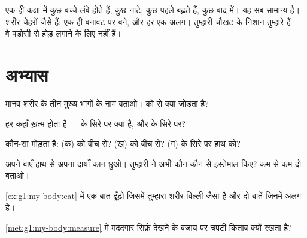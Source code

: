 \begin{remark}[हर शरीर अलग है]\label{rem:g1:my-body:different}
एक ही कक्षा में कुछ बच्चे लंबे होते हैं, कुछ नाटे; कुछ पहले बढ़ते हैं,
कुछ बाद में। यह सब सामान्य है। शरीर चेहरों जैसे हैं: एक ही बनावट पर
बने, और हर एक अलग। तुम्हारी चौखट के निशान तुम्हारे हैं --- वे पड़ोसी
से होड़ लगाने के लिए नहीं हैं।
\end{remark}

\section{अभ्यास}

\begin{exercise}[$\star$]\label{exo:g1:my-body:1}
मानव शरीर के तीन मुख्य भागों के नाम बताओ।  को  से क्या जोड़ता
है?
\end{exercise}

\begin{exercise}[$\star$]\label{exo:g1:my-body:2}
हर  कहाँ ख़त्म होता है ---  के सिरे पर क्या है, और  के
सिरे पर?
\end{exercise}

\begin{exercise}[$\star$]\label{exo:g1:my-body:3}
कौन-सा  मोड़ता है: (क)  को बीच से? (ख)  को बीच से? (ग)
 के सिरे पर हाथ को?
\end{exercise}

\begin{exercise}[$\star$]\label{exo:g1:my-body:4}
अपने बाएँ हाथ से अपना दायाँ कान छुओ। तुम्हारी  ने अभी कौन-कौन से
 इस्तेमाल किए? कम से कम दो बताओ।
\end{exercise}

\begin{exercise}[$\star$]\label{exo:g1:my-body:5}
\cref{ex:g1:my-body:cat} में एक बात ढूँढ़ो जिसमें तुम्हारा शरीर
बिल्ली जैसा है और दो बातें जिनमें अलग है।
\end{exercise}

\begin{exercise}[$\star$]\label{exo:g1:my-body:6}
\cref{met:g1:my-body:measure} में मददगार सिर्फ़ देखने के बजाय  पर
चपटी किताब क्यों रखता है?
\end{exercise}

